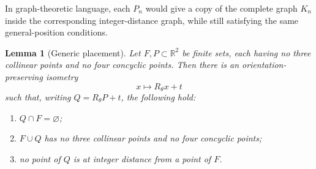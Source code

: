 \documentclass[11pt]{article}
\newtheorem{lemma}{Lemma}
\newcommand{\R}{\mathbb R}
\begin{document}
In graph-theoretic language, each \(P_n\) would give a copy of the complete graph \(K_n\) inside the corresponding integer-distance graph, while still satisfying the same general-position conditions.

\begin{lemma}[Generic placement]
Let \(F,P\subset\R^2\) be finite sets, each having no three collinear points and no four concyclic points. Then there is an orientation-preserving isometry
\[
x\longmapsto R_\theta x+t
\]
such that, writing \(Q=R_\theta P+t\), the following hold:
\begin{enumerate}
    \item \(Q\cap F=\varnothing\);
    \item \(F\cup Q\) has no three collinear points and no four concyclic points;
    \item no point of \(Q\) is at integer distance from a point of \(F\).
\end{enumerate}
\end{lemma}
\end{document}
